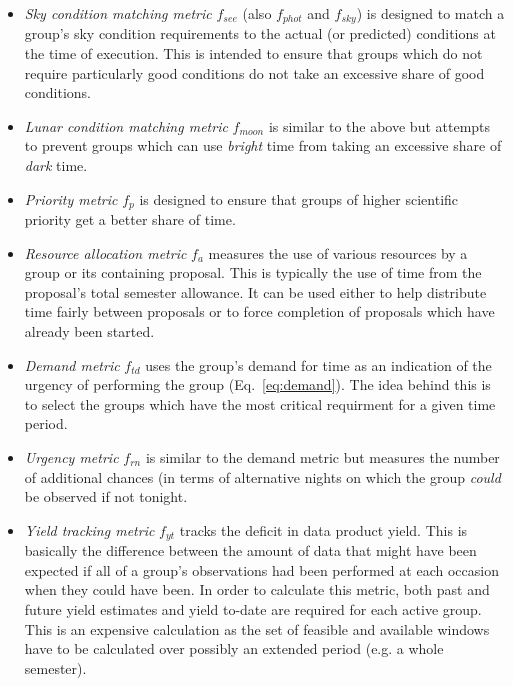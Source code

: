 \begin{itemize}
\item \emph{Sky condition matching metric} $f_{see}$ (also $f_{phot}$ and $f_{sky}$) is designed to match a group's sky condition requirements to the actual (or predicted) conditions at the time of execution. This is intended to ensure that groups which do not require particularly good conditions do not take an excessive share of good conditions.  

\item \emph{Lunar condition matching metric} $f_{moon}$ is similar to the above but attempts to prevent groups which can use \emph{bright} time from taking an excessive share of \emph{dark} time.

\item\emph{Priority metric} $f_p$ is designed to ensure that groups of higher scientific priority get a better share of time. 

\item \emph{Resource allocation metric} $f_{a}$ measures the use of various resources by a group or its containing proposal. This is typically the use of time from the proposal's total semester allowance. It can be used either to help distribute time fairly between proposals or to force completion of proposals which have already been started.

\item \emph{Demand metric} $f_{td}$ uses the group's demand for time as an indication of the urgency of performing the group (Eq.~\ref{eq:demand}). The idea behind this is to select the groups which have the most critical requirment for a given time period. 

\item \emph{Urgency metric} $f_{rn}$ is similar to the demand metric but measures the number of additional chances (in terms of alternative nights on which the group \emph{could} be observed if not tonight.

\item \emph{Yield tracking metric} $f_{yt}$ tracks the deficit in data product yield. This is basically the difference between the amount of data that might have been expected if all of a group's observations had been performed at each occasion when they could have been. In order to calculate this metric, both past and future yield estimates and yield to-date are required for each active group. This is an expensive calculation as the set of feasible and available windows have to be calculated over possibly an extended period (e.g. a whole semester).


\end{itemize}
